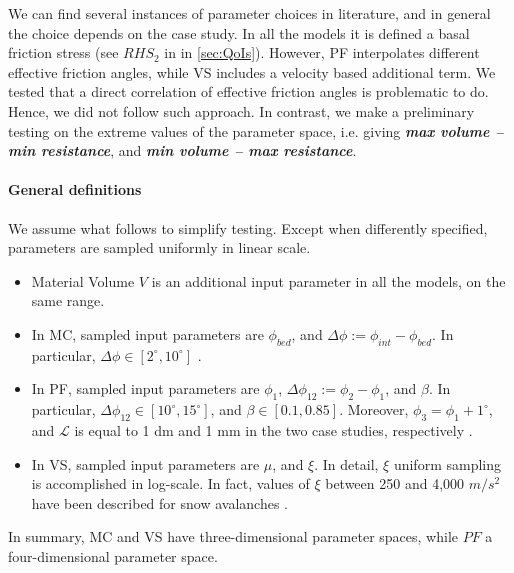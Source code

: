 \documentclass{article}
\begin{document}
We can find several instances of parameter choices in literature, and in general the choice depends on the case study. In all the models it is defined a basal friction stress (see $RHS_2$ in in \ref{sec:QoIs}). However, PF interpolates different effective friction angles, while VS includes a velocity based additional term. We tested that a direct correlation of effective friction angles is problematic to do. Hence, we did not follow such approach. In contrast, we make a preliminary testing on the extreme values of the parameter space, i.e. giving \emph{\textbf{max volume -- min resistance}}, and \emph{\textbf{min volume -- max resistance}}.

\paragraph{General definitions}
We assume what follows to simplify testing. Except when differently specified, parameters are sampled uniformly in linear scale.
\begin{itemize}
\item Material Volume $V$ is an additional input parameter in all the models, on the same range.

\item In MC, sampled input parameters are $\phi_{bed}$, and $\Delta \phi:=\phi_{int}-\phi_{bed}$. In particular, $\Delta \phi \in [2^{\mathrm{\circ}}, 10^{\mathrm{\circ}}]$ \citep{Dalbey2008}.

\item In PF, sampled input parameters are $\phi_1$, $\Delta \phi_{12}:=\phi_2-\phi_1$, and $\beta$. In particular, $\Delta \phi_{12} \in [10^{\mathrm{\circ}}, 15^{\mathrm{\circ}}]$, and $\beta \in [0.1, 0.85]$. Moreover, $\phi_3=\phi_1+1^\mathrm{\circ}$, and $\mathcal{L}$ is equal to 1 dm and 1 mm in the two case studies, respectively \citep{PouliquenForterre2002,ForterrePouliquen2003,Gray2014, Barker2015}.

\item In VS, sampled input parameters are $\mu$, and $\xi$. In detail, $\xi$ uniform sampling is accomplished in log-scale. In fact, values of $\xi$ between 250 and 4,000 $m/s^2$ have been described for snow avalanches \citep{Salm1993,Bartelt1999,Gruber2007}.
\end{itemize}
In summary, MC and VS have three-dimensional parameter spaces, while $PF$ a four-dimensional parameter space.
\end{document}
